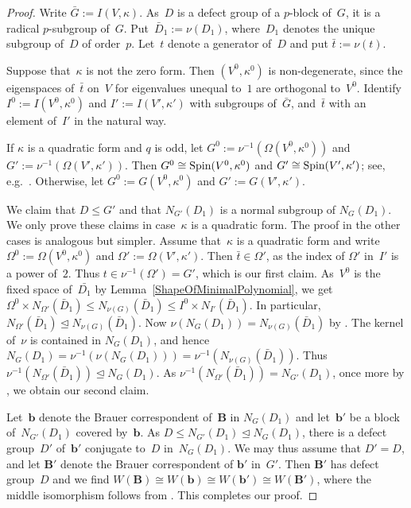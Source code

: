 \documentclass[12pt]{amsart}
\newcommand{\bB}{{\mathbf{B}}}
\newcommand{\bb}{{\mathbf{b}}}
\def\Spin{ \text{\rm Spin} }
\theoremstyle{theorem}
\theoremstyle{definition}
\theoremstyle{remark}
\begin{document}
\begin{proof}
Write $\bar{G} := I( V, \kappa )$. As~$D$ is a defect group of a $p$-block 
of~$G$, it is a radical $p$-subgroup of~$G$. Put~$\bar{D}_1 := \nu( D_1 )$, 
where~$D_1$ denotes the unique subgroup of~$D$ of order~$p$. Let~$t$ denote a 
generator of~$D$ and put $\bar{t} := \nu(t)$.

Suppose that~$\kappa$ is not the zero form. Then $(V^0, \kappa^0 )$ is 
non-degenerate, since the eigenspaces 
of~$\bar{t}$ on~$V$ for eigenvalues unequal to~$1$ are orthogonal to~$V^0$.
Identify $I^0 := I( V^0, \kappa^0 )$ and $I' := I( V', \kappa ' )$ with 
subgroups of~$\bar{G}$, and~$\bar{t}$ with an element of~$I'$ in the natural 
way.  

If $\kappa$ is a quadratic form and $q$ is odd, let 
$G^0 := \nu^{-1}( \Omega( V^0, \kappa^0 ))$ and 
$G' := \nu^{-1}( \Omega( V', \kappa' ))$. Then 
$G^0 \cong \Spin( V^0, \kappa^0 )$ and $G' \cong \Spin( V', \kappa' )$; see, 
e.g.\ \cite[Chapter V, Section~$4$]{Artin}. Otherwise, let 
$G^0 := G( V^0, \kappa^0 )$ and $G' := G( V', \kappa' )$. 

We claim that $D \leq G'$ and that $N_{G'}( D_1 )$ is a normal subgroup of 
$N_G( D_1 )$. We only prove these claims in case~$\kappa$ is a quadratic form.
The proof in the other cases is analogous but simpler. Assume that~$\kappa$ is a 
quadratic form and  write $\Omega^0 := \Omega( V^0, \kappa^0 )$ and $\Omega' :=
\Omega( V', \kappa' )$. Then $\bar{t} \in \Omega'$, as the index of $\Omega'$ 
in~$I'$ is a power of~$2$. Thus $t \in \nu^{-1}( \Omega' ) = G'$, which is our
first claim. As~$V^0$ is the fixed space of~$\bar{D_1}$ by 
Lemma~\ref{ShapeOfMinimalPolynomial}, we get
$\Omega^0 \times N_{\Omega'}( \bar{D}_1 ) \leq N_{\nu(G)}( \bar{D}_1 ) \leq 
I^0 \times N_{I'}( \bar{D}_1 )$. In particular, $N_{\Omega'}( \bar{D}_1 ) 
\unlhd N_{\nu(G)}( \bar{D}_1 )$. Now $\nu( N_{G}( D_1 ) ) = 
N_{\nu(G)}( \bar{D}_1 )$ by \cite[Lemma~$2.2$(a)]{HL24}. The kernel 
of~$\nu$ is contained in $N_{G}( D_1 )$, and hence 
$N_G( D_1 ) = \nu^{-1}( \nu( N_G( D_1 ) ) ) = \nu^{-1}( N_{\nu(G)}( \bar{D}_1 ))$. 
Thus $\nu^{-1}( N_{\Omega'}( \bar{D}_1 ) ) \unlhd N_{G}( D_1 )$. As
$\nu^{-1}( N_{\Omega'}( \bar{D}_1 ) ) = N_{G'}( D_1 )$, once more by 
\cite[Lemma~$2.2$(a)]{HL24}, we obtain our second claim.

Let~$\bb$ denote the 
Brauer correspondent of~$\bB$ in $N_G( D_1 )$ and let~$\bb'$ be a block 
of~$N_{G'}( D_1 )$ covered by~$\bb$. As 
$D \leq N_{G'}( D_1 ) \unlhd N_G( D_ 1)$, there is a defect group~$D'$ 
of~$\bb'$ conjugate to~$D$ in~$N_G( D_1 )$. We may thus assume that
$D' = D$, and let $\bB'$ denote the Brauer correspondent of $\bb'$ in~$G'$.
Then $\bB'$ has defect group~$D$ and we find
$W( \bB ) \cong W( \bb ) \cong W( \bb' ) \cong W( \bB' )$, where the middle 
isomorphism follows from \cite[Corollary~$4.4$]{HL24}. This completes our proof.
\end{proof}
 
\end{document}
